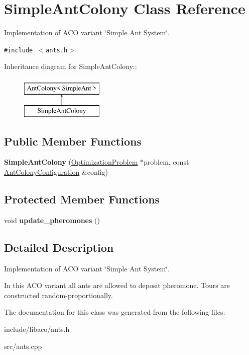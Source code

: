 \hypertarget{classSimpleAntColony}{
\section{SimpleAntColony Class Reference}
\label{classSimpleAntColony}
}
Implementation of ACO variant \char`\"{}Simple Ant System\char`\"{}.  


{\tt \#include $<$ants.h$>$}

Inheritance diagram for SimpleAntColony::\begin{figure}[H]
\begin{center}
\leavevmode
\includegraphics[height=2cm]{classSimpleAntColony}
\end{center}
\end{figure}
\subsection*{Public Member Functions}
\begin{CompactItemize}
\item 
\hypertarget{classSimpleAntColony_9e053cd8a5a0291acc151c5d71de5b8d}{
\textbf{SimpleAntColony} (\hyperlink{classOptimizationProblem}{OptimizationProblem} $\ast$problem, const \hyperlink{classAntColonyConfiguration}{AntColonyConfiguration} \&config)}
\label{classSimpleAntColony_9e053cd8a5a0291acc151c5d71de5b8d}

\end{CompactItemize}
\subsection*{Protected Member Functions}
\begin{CompactItemize}
\item 
\hypertarget{classSimpleAntColony_e480fd0adbd02d44dce7662e079d6794}{
void \textbf{update\_\-pheromones} ()}
\label{classSimpleAntColony_e480fd0adbd02d44dce7662e079d6794}

\end{CompactItemize}


\subsection{Detailed Description}
Implementation of ACO variant \char`\"{}Simple Ant System\char`\"{}. 

In this ACO variant all ants are allowed to deposit pheromone. Tours are constructed random-proportionally. 

The documentation for this class was generated from the following files:\begin{CompactItemize}
\item 
include/libaco/ants.h\item 
src/ants.cpp\end{CompactItemize}
